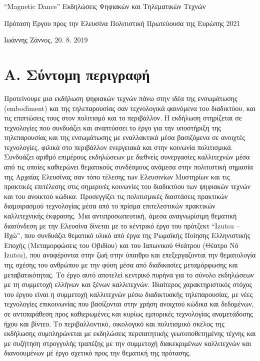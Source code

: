 \noindent
“Magnetic Dance”
Εκδηλώσεις Ψηφιακών και Τηλεματικών Τεχνών 

Πρόταση Έργου προς την 
Ελευσίνα Πολιτιστική Πρωτεύουσα της Ευρώπης 2021

Ιωάννης Ζάννος, 20. 8. 2019

\section{Α. Σύντομη περιγραφή}
\label{sec:org4b1a471}
Προτείνουμε μια εκδήλωση ψηφιακών τεχνών πάνω στην ιδέα της ενσωμάτωσης (embodiment) και της τηλεπαρουσίας σαν τεχνολογικά φαινόμενα του διαδικτύου, και τις επιπτώσεις τους στον πολιτισμό και το περιβάλλον. Η εκδήλωση στηρίζεται σε τεχνολογίες που συνδυάζει και αναπτύσσει το έργο για την υποστήριξη της τηλεπαρουσίας και της ενσωμάτωσης με εναλλακτικά μέσα βασιζόμενα σε ανοιχτές τεχνολογίες, φιλικά στο περιβάλλον ενεργειακά και στην κοινωνία πολιτισμικά.  Συνδυάζει αριθμό επιμέρους εκδηλώσεων με διεθνείς συνεργασίες καλλιτεχνών μέσα από τις οποίες καθιερώνει θεματικούς συνδέσμους ανάμεσα στην πολιτιστική σημασία της Αρχαίας Ελευσίνας σαν τόπο τέλεσης των Ελευσινίων Μυστηρίων και τις πρακτικές επιτέλεσης στις σημερινές κοινωνίες του διαδικτύου των ψηφιακών τεχνών και του ανοικτού κώδικα.  Προσεγγίζει τις πολιτισμικές διαστάσεις πρακτικών διαμοιρασμού τεχνολογίας μέσα από το πρίσμα επιτελεστικών πρακτικών καλλιτεχνικής έκφρασης. 
 Μια αντιπροσωπευτική, άμεσα αναγνωρίσιμη θεματική διασύνδεση με την Ελευσίνα δίνεται με το κέντρικό έργο του πρότζεκτ “Izutsu – Ηχώ”, που συνδυάζει θεματικό υλικό από έργα της Ρωμαϊκής Ποίησης Ελληνιστικής Εποχής (Μεταμορφώσεις του Οβιδίου) και του Ιαπωνικού Θεάτρου (Θέατρο Νό Ιzutsu), που αναφέρονται στην ζωή στην ύπαιθρο και επεξεργαζονται την θεματολογία της σχέσης του ανθρώπου με την φύση μέσα από διαδικασίες μεταμόρφωσης και μεταβατικότητας. Το έργο αυτό αποτελεί κεντρικό πυρήνα για το σύνολο εκδηλώσεων με τη συμμετοχή ελλήνων και ξένων καλλιτεχνών. Ιδιαίτερος χαρακτηριστικός στόχος του έργου είναι η συμμετοχή καλλιτεχνών μέσω διαδικτυακής τηλεπαρουσίας, με νέες τεχνολογίες επικοινωνίας που βασίζονται στην χρήση ανοιχτού κώδικα και δεδομένων, σε αντιπαράθεση προς καθιερωμένες και κυρίως εμπορικές τεχνολογίας αναμετάδοσης ήχου και βίντεο. Το περιβαλλοντικό, οικολογικό και πολιτισμικό σκέλος της εκδήλωσης συμπληρώνεται με εκδηλώσεις περιπατητικής γεωτοποθετημένης τέχνης και με συζήτηση στρογγυλής τραπέζης με την συμμετοχή διακεκριμένων καλλιτεχνών και διανοουμένων μέ έργο σχετικό προς την θεματική της πρότασης.  

